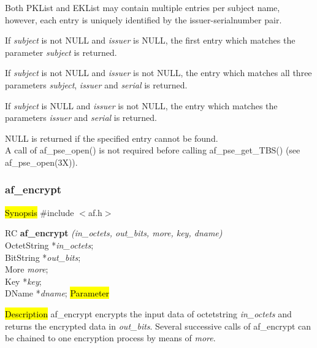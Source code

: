 Both PKList and EKList may contain multiple entries per subject name, however,
each entry is uniquely identified by the issuer-serialnumber pair.

If {\em subject} is not NULL and {\em issuer} is NULL, the first entry which
matches the parameter {\em subject} is returned.

If {\em subject} is not NULL and {\em issuer} is not NULL, the entry which 
matches all three parameters {\em subject}, {\em issuer} and {\em serial} is returned.
 
If {\em subject} is NULL and {\em issuer} is not NULL, the entry which matches the
parameters {\em issuer} and {\em serial} is returned.

NULL is returned if the specified entry cannot be found.
\\ [1em]
A call of af\_pse\_open() is not required before calling af\_pse\_get\_TBS()
(see af\_pse\_open(3X)).

\subsubsection{af\_encrypt}
\label{af_encrypt}
\hl{Synopsis}
\#include $<$af.h$>$

RC {\bf af\_encrypt} {\em (in\_octets, out\_bits, more, key, dname)} \\
OctetString *{\em in\_octets}; \\
BitString *{\em out\_bits}; \\
More {\em more}; \\
Key *{\em key}; \\
DName *{\em dname};
\hl{Parameter}





\hl{Description}
af\_encrypt encrypts the input data of octetstring {\em in\_octets} and returns the encrypted data
in {\em out\_bits}. Several successive calls of af\_encrypt can be chained
to one encryption process by means of {\em more}.

